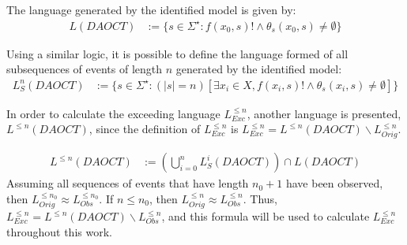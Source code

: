 The language generated by the identified \DAOCT{} model is given by:
\begin{align}
  L(DAOCT)&:=\{s \in \Sigma^\star : f(x_0,s)! \wedge \theta_s(x_0,s)\neq \emptyset \}
\end{align}

Using a similar logic, it is possible to define the language formed of all
subsequences of events of length $n$ generated by the identified model:
\begin{align}
  L_S^n(DAOCT)&:=\{s \in \Sigma^\star : (|s| = n)\left[\exists x_i \in X,f(x_i,s)! \wedge \theta_s(x_i,s)\neq \emptyset \right]\}
\end{align}

In order to calculate the exceeding language $L_{Exc}^{\leq n}$, another
language is presented, $L^{\leq n}(DAOCT)$, since the definition of
$L_{Exc}^{\leq n}$ is $L_{Exc}^{\leq n}=L^{\leq n}(DAOCT)\backslash
L_{Orig}^{\leq n}$.


\begin{align}
  L^{\leq n}(DAOCT)&:=\left( \bigcup_{i=0}^n L_S^i(DAOCT) \right)\cap L(DAOCT)
\end{align}
Assuming all sequences of events that have length $n_0+1$ have been
observed, then $L_{Orig}^{\leq n_0}\approx L_{Obs}^{\leq n_0}$. If $n\leq n_0$,
then $L_{Orig}^{\leq n}\approx L_{Obs}^{\leq n}$. Thus, $L_{Exc}^{\leq n}=L^{\leq n}(DAOCT)\backslash
L_{Obs}^{\leq n}$, and this formula will be used to calculate $L_{Exc}^{\leq n}$
throughout this work. 
